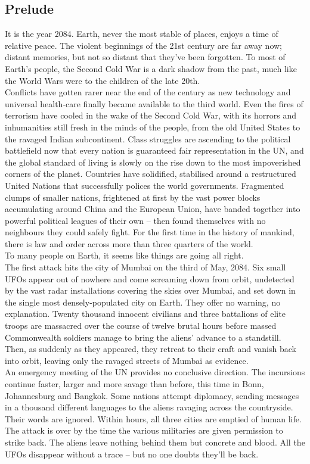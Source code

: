 \subsection{Prelude}
It is the year 2084. Earth, never the most stable of places, enjoys a time of relative peace. The violent beginnings of the 21st century are far away now; distant memories, but not so distant that they've been forgotten. To most of Earth's people, the Second Cold War is a dark shadow from the past, much like the World Wars were to the children of the late 20th.\\
Conflicts have gotten rarer near the end of the century as new technology and universal health-care finally became available to the third world. Even the fires of terrorism have cooled in the wake of the Second Cold War, with its horrors and inhumanities still fresh in the minds of the people, from the old United States to the ravaged Indian subcontinent. Class struggles are ascending to the political battlefield now that every nation is guaranteed fair representation in the UN, and the global standard of living is slowly on the rise down to the most impoverished corners of the planet. Countries have solidified, stabilised around a restructured United Nations that successfully polices the world governments. Fragmented clumps of smaller nations, frightened at first by the vast power blocks accumulating around China and the European Union, have banded together into powerful political leagues of their own -- then found themselves with no neighbours they could safely fight. For the first time in the history of mankind, there is law and order across more than three quarters of the world.\\
To many people on Earth, it seems like things are going all right.\\
The first attack hits the city of Mumbai on the third of May, 2084. Six small UFOs appear out of nowhere and come screaming down from orbit, undetected by the vast radar installations covering the skies over Mumbai, and set down in the single most densely-populated city on Earth. They offer no warning, no explanation. Twenty thousand innocent civilians and three battalions of elite troops are massacred over the course of twelve brutal hours before massed Commonwealth soldiers manage to bring the aliens' advance to a standstill. Then, as suddenly as they appeared, they retreat to their craft and vanish back into orbit, leaving only the ravaged streets of Mumbai as evidence.\\
An emergency meeting of the UN provides no conclusive direction. The incursions continue faster, larger and more savage than before, this time in Bonn, Johannesburg and Bangkok. Some nations attempt diplomacy, sending messages in a thousand different languages to the aliens ravaging across the countryside. Their words are ignored. Within hours, all three cities are emptied of human life. The attack is over by the time the various militaries are given permission to strike back. The aliens leave nothing behind them but concrete and blood. All the UFOs disappear without a trace -- but no one doubts they'll be back.\\
